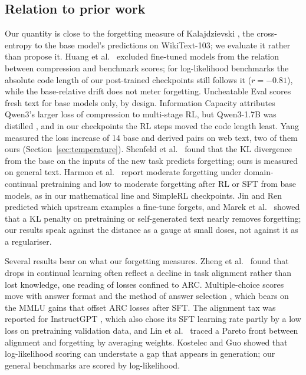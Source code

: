 \documentclass[11pt,a4paper]{article}
\theoremstyle{definition}
\begin{document}
\subsection{Relation to prior work}

Our quantity is close to the forgetting measure of Kalajdzievski \citep{kalajdzievski2024scaling}, the
cross-entropy to the base model's predictions on WikiText-103; we evaluate it rather than propose it. Huang et
al.\ \citep{huang2024compression} excluded fine-tuned models from the relation between compression and benchmark
scores; for log-likelihood benchmarks the absolute code length of our post-trained checkpoints still follows it
($r=-0.81$), while the base-relative drift does not meter forgetting. Uncheatable Eval \citep{tan2026uncheatable}
scores fresh text for base models only, by design. Information Capacity \citep{yuan2025capacity} attributes
Qwen3's larger loss of compression to multi-stage RL, but Qwen3-1.7B was distilled \citep{yang2025qwen3}, and in
our checkpoints the RL steps moved the code length least. Yang \citep{yang2026vocab} measured the loss increase of
14 base and derived pairs on web text, two of them ours (Section~\ref{sec:temperature}). Shenfeld et al.\
\citep{shenfeld2025razor} found that the KL divergence from the base on the inputs of the new task predicts
forgetting; ours is measured on general text. Harmon et al.\ \citep{harmon2025mapping} report moderate forgetting
under domain-continual pretraining and low to moderate forgetting after RL or SFT from base models, as in our
mathematical line and SimpleRL checkpoints. Jin and Ren \citep{jin2024forgetting} predicted which upstream examples
a fine-tune forgets, and Marek et al.\ \citep{marek2026forgetting} showed that a KL penalty on pretraining or
self-generated text nearly removes forgetting; our results speak against the distance as a gauge at small doses,
not against it as a regulariser.

Several results bear on what our forgetting measures. Zheng et al.\ \citep{zheng2025spurious} found that drops in
continual learning often reflect a decline in task alignment rather than lost knowledge, one reading of losses
confined to ARC. Multiple-choice scores move with answer format and the method of answer selection
\citep{alzahrani2024benchmarks,zheng2024mcq}, which bears on the MMLU gains that offset ARC losses after SFT. The
alignment tax was reported for InstructGPT \citep{ouyang2022instructgpt}, which also chose its SFT learning rate
partly by a low loss on pretraining validation data, and Lin et al.\ \citep{lin2024alignmenttax} traced a Pareto
front between alignment and forgetting by averaging weights. Kostelec and Guo \citep{kostelec2026perplexity} showed
that log-likelihood scoring can understate a gap that appears in generation; our general benchmarks are scored by
log-likelihood.
\end{document}
